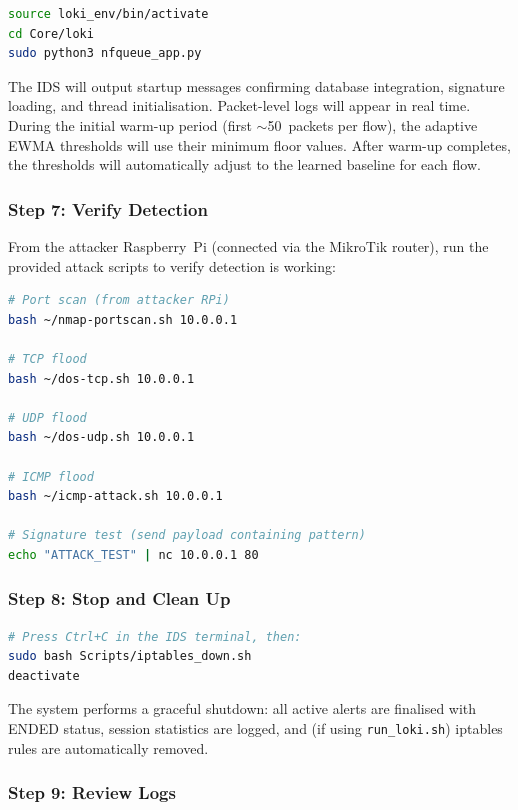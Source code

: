 \documentclass[12pt,a4paper]{article}
\begin{document}
\begin{lstlisting}[language=bash]
source loki_env/bin/activate
cd Core/loki
sudo python3 nfqueue_app.py
\end{lstlisting}

The IDS will output startup messages confirming database integration, signature loading, and thread initialisation. Packet-level logs will appear in real time. During the initial warm-up period (first $\sim$50~packets per flow), the adaptive EWMA thresholds will use their minimum floor values. After warm-up completes, the thresholds will automatically adjust to the learned baseline for each flow.

\subsubsection*{Step 7: Verify Detection}

From the attacker Raspberry~Pi (connected via the MikroTik router), run the provided attack scripts to verify detection is working:

\begin{lstlisting}[language=bash]
# Port scan (from attacker RPi)
bash ~/nmap-portscan.sh 10.0.0.1

# TCP flood
bash ~/dos-tcp.sh 10.0.0.1

# UDP flood
bash ~/dos-udp.sh 10.0.0.1

# ICMP flood
bash ~/icmp-attack.sh 10.0.0.1

# Signature test (send payload containing pattern)
echo "ATTACK_TEST" | nc 10.0.0.1 80
\end{lstlisting}

\subsubsection*{Step 8: Stop and Clean Up}

\begin{lstlisting}[language=bash]
# Press Ctrl+C in the IDS terminal, then:
sudo bash Scripts/iptables_down.sh
deactivate
\end{lstlisting}

The system performs a graceful shutdown: all active alerts are finalised with ENDED status, session statistics are logged, and (if using \texttt{run\_loki.sh}) iptables rules are automatically removed.

\subsubsection*{Step 9: Review Logs}
\end{document}
